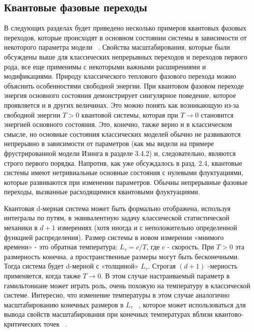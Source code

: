 \documentclass[11pt]{article}
\begin{document}
\subsection{Квантовые фазовые переходы}

В следующих разделах будет приведено несколько примеров квантовых фазовых переходов, которые происходят в основном состоянии системы в зависимости от некоторого параметра модели ~\cite{sachdev}. Свойства масштабирования, которые были обсуждены выше для классических непрерывных переходов и переходов первого рода, все еще применимы с некоторыми важными расширениями и модификациями. Природу классического теплового фазового перехода можно объяснить особенностями свободной энергии. При квантовом фазовом переходе энергия основного состояния демонстрирует сингулярное поведение, которое проявляется и в других величинах. Это можно понять как возникающую из-за свободной энергии $T> 0$ квантовой системы, которая при $T \to 0$ становится энергией основного состояния. Это, конечно, также верно и в классическом смысле, но основные состояния классических моделей обычно не развиваются непрерывно в зависимости от параметров (как мы видели на примере фрустрированной модели Изинга в разделе 3.4.2) и, следовательно, являются строго первого порядка. Напротив, как уже обсуждалось в разд. 2.4, квантовые системы имеют нетривиальные основные состояния с нулевыми флуктуациями, которые развиваются при изменении параметров. Обычны непрерывные фазовые переходы, вызванные расходящимися квантовыми флуктуациями.

Квантовая d-мерная  система может быть формально отображена, используя интегралы по путям, в эквивалентную задачу классической статистической механики в $d + 1$ измерениях (хотя иногда и с неположительно определенной функцией распределения). Размер системы в новом измерении «мнимого времени» - это обратная температура; $L_{\tau} = c / T$, где c - скорость. При $T> 0$ эта размерность конечна, а пространственные размеры могут быть бесконечными. Тогда система будет d-мерной с «толщиной» $L_{\tau}$. Строгая $(d + 1)$ -мерность применяется, когда также $T \to 0$. В этом случае настраиваемый параметр в гамильтониане может играть роль, очень похожую на температуру в классической системе. Интересно, что изменение температуры в этом случае аналогично масштабированию конечных размеров в $L_{\tau}$ ~\cite{prb_39_2344}, которое может использоваться для вывода свойств масштабирования при конечных температурах вблизи квантово-критических точек ~\cite{prb_49_11919}.
\end{document}
